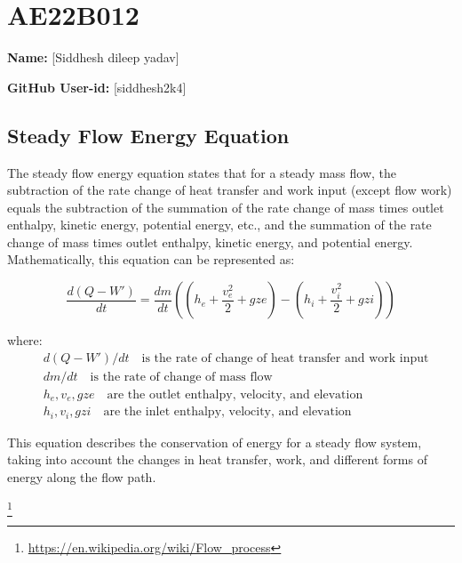 \documentclass{article}
\begin{document}
\section{AE22B012}
\textbf{Name:} [Siddhesh dileep yadav]

\textbf{GitHub User-id:} [siddhesh2k4]

\subsection{Steady Flow Energy Equation}

The steady flow energy equation states that for a steady mass flow, the subtraction of the rate change of heat transfer and work input (except flow work) equals the subtraction of the summation of the rate change of mass times outlet enthalpy, kinetic energy, potential energy, etc., and the summation of the rate change of mass times outlet enthalpy, kinetic energy, and potential energy. Mathematically, this equation can be represented as:

\begin{equation}
    \frac{d(Q - W')}{dt} = \frac{dm}{dt} \left( (h_e + \frac{{v_e^2}}{2} + gze) - (h_i + \frac{{v_i^2}}{2} + gzi) \right)
\end{equation}

where:
\begin{align*}
    & d(Q - W')/dt \quad \text{is the rate of change of heat transfer and work input} \\
    & dm/dt \quad \text{is the rate of change of mass flow} \\
    & h_e, v_e, gze \quad \text{are the outlet enthalpy, velocity, and elevation} \\
    & h_i, v_i, gzi \quad \text{are the inlet enthalpy, velocity, and elevation}
\end{align*}

This equation describes the conservation of energy for a steady flow system, taking into account the changes in heat transfer, work, and different forms of energy along the flow path.

\footnote{\url{https://en.wikipedia.org/wiki/Flow_process}}
\end{document}
